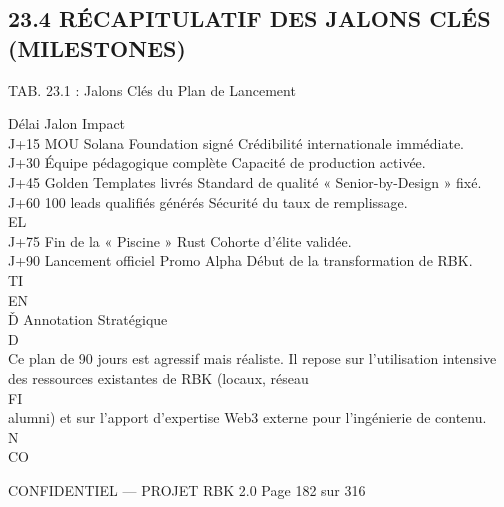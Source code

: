 \documentclass[12pt,landscape,a4paper]{article}
\newenvironment{confidential}
{\begin{tcolorbox}[
    colback=rbkred!5!white,
    colframe=rbkred!75!black,
    title=CONFIDENTIEL,
    fonttitle=\bfseries\color{white},
    coltitle=rbkred!75!black,
    breakable,
    enhanced,
    frame hidden,
    borderline west={2pt}{0pt}{rbkred!75!black}
]}
{\end{tcolorbox}}
\begin{document}
\subsection{23.4 RÉCAPITULATIF DES JALONS CLÉS (MILESTONES)}
\vspace{0.5em}
\begin{center}\begin{tabular}TAB. 23.1 : Jalons Clés du Plan de Lancement\end{tabular}\end{center}
\vspace{0.5em}
\vspace{0.5em}
Délai Jalon                         Impact\\
J+15 MOU Solana Foundation signé Crédibilité internationale immédiate.\\
J+30 Équipe pédagogique complète Capacité de production activée.\\
J+45 Golden Templates livrés        Standard de qualité « Senior-by-Design » fixé.\\
J+60 100 leads qualifiés générés    Sécurité du taux de remplissage.\\
\vspace{0.5em}
\vspace{0.5em}
\vspace{0.5em}
\vspace{0.5em}
EL\\
J+75 Fin de la « Piscine » Rust     Cohorte d’élite validée.\\
J+90 Lancement officiel Promo Alpha Début de la transformation de RBK.\\
\vspace{0.5em}
\vspace{0.5em}
\vspace{0.5em}
\vspace{0.5em}
TI\\
EN\\
Ď Annotation Stratégique\\
\vspace{0.5em}
\vspace{0.5em}
\vspace{0.5em}
D\\
Ce plan de 90 jours est agressif mais réaliste. Il repose sur l’utilisation intensive des ressources existantes de RBK (locaux, réseau\\
\vspace{0.5em}
\vspace{0.5em}
\vspace{0.5em}
\vspace{0.5em}
FI\\
alumni) et sur l’apport d’expertise Web3 externe pour l’ingénierie de contenu.\\
\vspace{0.5em}
N\\
CO\\
\vspace{0.5em}
\vspace{0.5em}
\vspace{0.5em}
\vspace{0.5em}
\begin{confidential}CONFIDENTIEL — PROJET RBK 2.0                                 Page 182 sur 316\end{confidential}
\end{document}

